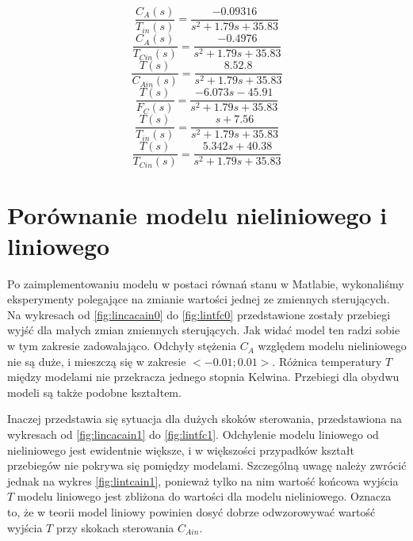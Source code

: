 \begin{equation}
\frac{C_A(s)}{T_{in}(s)} = \frac{-0.09316}{s^2+1.79s+35.83}
\end{equation}
\begin{equation}
\frac{C_A(s)}{T_{Cin}(s)} = \frac{-0.4976}{s^2+1.79s+35.83}
\end{equation}
\begin{equation}
\frac{T(s)}{C_{Ain}(s)} = \frac{8.52.8}{s^2+1.79s+35.83}
\end{equation}
\begin{equation}
\frac{T(s)}{F_C(s)} = \frac{-6.073s-45.91}{s^2+1.79s+35.83}
\end{equation}
\begin{equation}
\frac{T(s)}{T_{in}(s)} = \frac{s + 7.56}{s^2+1.79s+35.83}
\end{equation}
\begin{equation}
\frac{T(s)}{T_{Cin}(s)} = \frac{5.342 s + 40.38}{s^2+1.79s+35.83}
\end{equation}
\newpage
\section{Porównanie modelu nieliniowego i liniowego}
Po zaimplementowaniu modelu w postaci równań stanu w Matlabie, wykonaliśmy eksperymenty polegające na zmianie wartości jednej ze zmiennych sterujących. Na wykresach od \ref{fig:lincacain0} do \ref{fig:lintfc0} przedstawione zostały przebiegi wyjść dla małych zmian zmiennych sterujących. Jak widać model ten radzi sobie w tym zakresie zadowalająco. Odchyły stężenia $C_A$ względem modelu nieliniowego nie są duże, i mieszczą się w zakresie $<-0.01;0.01>$. Różnica temperatury $T$ między modelami nie przekracza jednego stopnia Kelwina. Przebiegi dla obydwu modeli są także podobne kształtem.

Inaczej przedstawia się sytuacja dla dużych skoków sterowania, przedstawiona na wykresach od \ref{fig:lincacain1} do \ref{fig:lintfc1}. Odchylenie modelu liniowego od nieliniowego jest ewidentnie większe, i w większości przypadków kształt przebiegów nie pokrywa się pomiędzy modelami. Szczególną uwagę należy zwrócić jednak na wykres \ref{fig:lintcain1}, ponieważ tylko na nim wartość końcowa wyjścia $T$ modelu liniowego jest zbliżona do wartości dla modelu nieliniowego. Oznacza to, że w teorii model liniowy powinien dosyć dobrze odwzorowywać wartość wyjścia $T$ przy skokach sterowania $C_{Ain}$.

